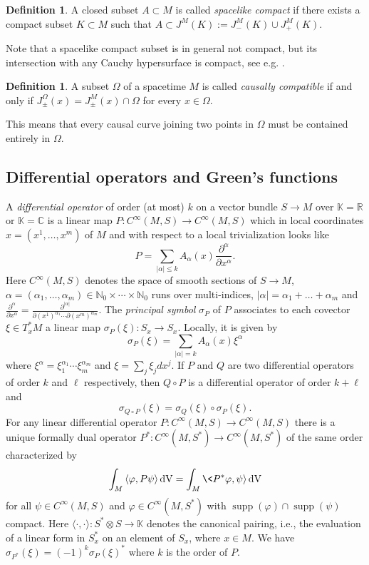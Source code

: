 \documentclass[a4paper,11pt]{amsart}
\theoremstyle{definition}
\newtheorem{definition}[thm]{Definition}
\begin{document}
\begin{definition}\label{def-spacelikecompact}
A closed subset $A\subset M$ is called {\em spacelike compact} if there exists a compact subset $K\subset M$ such that $A \subset J^M(K) := J_-^M(K) \cup J_+^M(K)$.
\end{definition}

Note that a spacelike compact subset is in general not compact, but its intersection with any Cauchy hypersurface is compact, see e.g. \cite[Cor. A.5.4]{BGP}.

\begin{definition}\label{def-causcompat}
A subset $\Omega$ of a spacetime $M$ is called \emph{causally compatible} if and only if $J_\pm^\Omega(x)=J_\pm^M(x)\cap\Omega$ for every $x\in\Omega$.
\end{definition}

This means that every causal curve joining two points in $\Omega$ must be contained entirely in $\Omega$.

\subsection{Differential operators and Green's functions}

A {\em differential operator} of order (at most) $k$ on a vector bundle $S\rightarrow M$ over ${\mathbb{K}}={\mathbb{R}}$ or ${\mathbb{K}}={\mathbb{C}}$ is a linear map $P:{C^\infty}(M,S) \to {C^\infty}(M,S)$ which in local coordinates $x=(x^1,\ldots,x^m)$ of $M$ and with respect to a local trivialization looks like
$$
P = \sum_{|\alpha|\leq k}A_\alpha (x) \frac{\partial^\alpha}{\partial x^\alpha}.
$$
Here ${C^\infty}(M,S)$ denotes the space of smooth sections of $S\rightarrow M$, $\alpha=(\alpha_1,\ldots,\alpha_m)\in {\mathbb{N}}_0\times\cdots\times{\mathbb{N}}_0$ runs over multi-indices, $|\alpha|= \alpha_1 + \ldots + \alpha_m$ and $\frac{\partial^\alpha}{\partial x^\alpha} = \frac{\partial^{|\alpha|}}{\partial (x^1)^{\alpha_1} \cdots \partial (x^m)^{\alpha_m}}$.
The {\em principal symbol} $\sigma_P$ of $P$ associates to each covector $\xi\in T^*_xM$ a linear map $\sigma_P(\xi):S_x \to S_x$.
Locally, it is given by
$$
\sigma_P(\xi) = \sum_{|\alpha|= k}A_\alpha (x) \xi^\alpha
$$
where $\xi^\alpha = \xi_1^{\alpha_1}\cdots \xi_m^{\alpha_m}$ and $\xi = \sum_j \xi_j dx^j$.
If $P$ and $Q$ are two differential operators of order $k$ and $\ell$ respectively, then $Q\circ P$ is a differential operator of order $k+\ell$ and 
$$
\sigma_{Q\circ P}(\xi) = \sigma_{Q}(\xi) \circ \sigma_{P}(\xi) .
$$
For any linear differential operator $P:{C^\infty}(M,S) \to {C^\infty}(M,S)$ there is a unique formally dual operator $P^*:{C^\infty}(M,S^*) \to {C^\infty}(M,S^*)$ of the same order characterized by 
$$
\int_M {\langle}{\varphi},P\psi{\rangle} {\,\mathrm{dV}} = \int_M \<P^*{\varphi},\psi{\rangle} {\,\mathrm{dV}} 
$$
for all $\psi\in{C^\infty}(M,S)$ and ${\varphi}\in{C^\infty}(M,S^*)$ with ${\operatorname{supp}}({\varphi}) \cap {\operatorname{supp}}(\psi)$ compact.
Here ${\langle}\cdot,\cdot{\rangle}:S^*\otimes S \to {\mathbb{K}}$ denotes the canonical pairing, i.e., the evaluation of a linear form in $S_x^*$ on an element of $S_x$, where $x\in M$.
We have $\sigma_{P^*}(\xi) = (-1)^k\sigma_P(\xi)^*$ where $k$ is the order of $P$.
\end{document}
